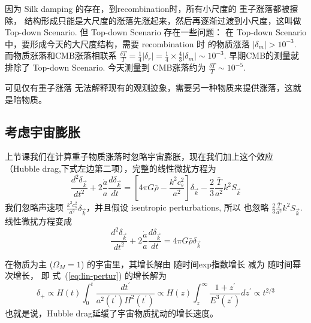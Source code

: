 \documentclass[12pt]{ctexart}
\newcommand{\new}[1]{\textcolor{blue}{#1}}
\newcommand{\refeq}[1]{式~(\ref{#1})}
\begin{document}
因为 Silk damping 的存在，到recombination时，所有小尺度的 重子涨落都被擦除，
结构形成只能是大尺度的涨落先涨起来，然后再逐渐过渡到小尺度，这叫做
Top-down Scenario.
但 Top-down Scenario
存在一些问题：
在 Top-down Scenario 中，要形成今天的大尺度结构，需要 recombination 时
的物质涨落 $|\delta_m|> 10^{-3}$. 
而物质涨落和CMB涨落相联系
$\frac{\delta T}{T}=\frac{1}{4} |\delta_r| = \frac{1}{4} \times \frac{4}{3} |\delta_m| \sim 10^{-3}$.
早期CMB的测量就排除了 Top-down Scenario. 今天测量到 CMB涨落约为 
$\frac{\delta T}{T} \sim 10^{-5}$.

可见仅有重子涨落 无法解释现有的观测迹象，需要另一种物质来提供涨落，这就是暗物质。

\subsection{考虑宇宙膨胀}

上节课我们在计算重子物质涨落时忽略宇宙膨胀，现在我们加上这个效应（Hubble drag,下式左边第二项），完整的线性微扰方程为
\begin{equation} \label{eq:lin-pertur_Fouri}
    \frac{d^2 \delta_{\vec{k}}}{dt^2 } + 2\frac{\dot{a}}{a} \frac{d\delta_{\vec{k}}}{dt} = \left[4\pi G \bar{\rho}-\frac{k^2c_s^2}{a^2}\right] \delta_{\vec{k}} -\frac{2}{3}\frac{\bar{T}}{a^2}k^2 S_{\vec{k}}
\end{equation}
我们忽略声速项 $\frac{k^2c_s^2}{a^2} \delta_{\vec{k}}$，并且假设 isentropic perturbations, 所以 也忽略 $\frac{2}{3}\frac{\bar{T}}{a^2}k^2 S_{\vec{k}}$. 
线性微扰方程变成
\begin{equation} \label{eq:lin-pertur}
    \frac{d^2 \delta_{\vec{k}}}{dt^2 } + 2\frac{\dot{a}}{a} \frac{d\delta_{\vec{k}}}{dt} = 4\pi G \bar{\rho} \delta_{\vec{k}} 
\end{equation}

在物质为主 ($\Omega_M=1$) 的宇宙里，其增长解由 随时间exp指数增长 减为 随时间幂次增长，
即
\refeq{eq:lin-pertur} 的增长解为
\begin{equation}
    \delta_{+} \propto H(t) \int_{0}^{t} \frac{d t^{\prime}}{a^{2}\left(t^{\prime}\right) H^{2}\left(t^{\prime}\right)} \propto H(z) \int_{z}^{\infty} \frac{1+z^{\prime}}{E^{3}\left(z^{\prime}\right)} d z^{\prime} \propto t^{2/3}
\end{equation}
也就是说，Hubble drag延缓了宇宙物质扰动的增长速度。
\end{document}
